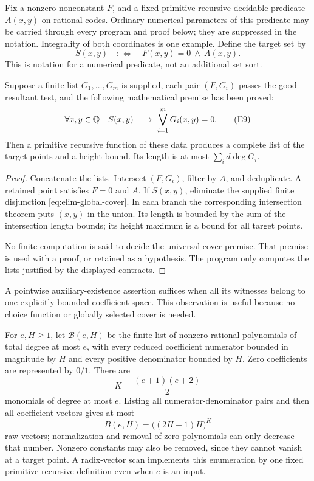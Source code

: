 Fix a nonzero nonconstant \(F\), and a fixed primitive recursive
decidable predicate \(A(x,y)\) on rational codes.  Ordinary numerical
parameters of this predicate may be carried through every program and
proof below; they are suppressed in the notation.  Integrality of both
coordinates is one example.  Define the target set by
\[
 S(x,y)\quad:\Longleftrightarrow\quad F(x,y)=0\ \wedge\ A(x,y).
\]
This is notation for a numerical predicate, not an additional set sort.

\begin{corollary}
\label{cor:elim-global-cover}
Suppose a finite list \(G_1,\ldots,G_m\) is supplied, each pair
\((F,G_i)\) passes the good-resultant test, and the following mathematical
premise has been proved:
\[
 \forall x,y\in\mathbb Q\quad
 S(x,y)\ \longrightarrow\ \bigvee_{i=1}^mG_i(x,y)=0.
 \tag{E9}\label{eq:elim-global-cover}
\]
Then a primitive recursive function of these data produces a complete
list of the target points and a height bound.  Its length is at most
\(\sum_i d\deg G_i\).
\end{corollary}

\begin{proof}
Concatenate the lists \(\operatorname{Intersect}(F,G_i)\), filter by
\(A\), and deduplicate.  A retained point satisfies \(F=0\) and \(A\).
If \(S(x,y)\), eliminate the supplied finite disjunction
\eqref{eq:elim-global-cover}.  In each branch the corresponding
intersection theorem puts \((x,y)\) in the union.  Its length is bounded
by the sum of the intersection length bounds; its height maximum is a
bound for all target points.

No finite computation is said to decide the universal cover premise.
That premise is used with a proof, or retained as a hypothesis.  The
program only computes the lists justified by the displayed contracts.
\end{proof}

A pointwise auxiliary-existence assertion suffices when all its witnesses
belong to one explicitly bounded coefficient space.  This observation is
useful because no choice function or globally selected cover is needed.

For \(e,H\ge1\), let \(\mathcal B(e,H)\) be the finite list of nonzero
rational polynomials of total degree at most \(e\), with every reduced
coefficient numerator bounded in magnitude by \(H\) and every positive
denominator bounded by \(H\).  Zero coefficients are represented by
\(0/1\).  There are
\[
 K=\frac{(e+1)(e+2)}2
\]
monomials of degree at most \(e\).  Listing all numerator-denominator
pairs and then all coefficient vectors gives at most
\[
 B(e,H)=\bigl((2H+1)H\bigr)^K
 \tag{E10}\label{eq:elim-box-size}
\]
raw vectors; normalization and removal of zero polynomials can only
decrease that number.  Nonzero constants may also be removed, since they
cannot vanish at a target point.  A radix-vector scan implements this
enumeration by one fixed primitive recursive definition even when \(e\)
is an input.

